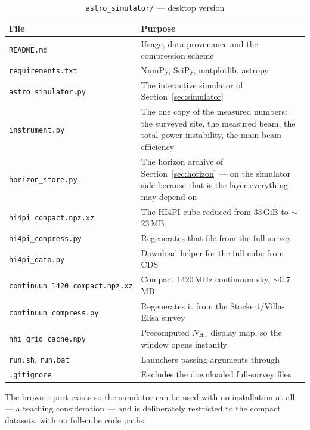\documentclass[11pt,a4paper]{article}
\begin{document}
\begin{table}[H]
\centering
\caption{\texttt{astro\_simulator/} --- desktop version}
\small
\begin{tabular}{lp{8.6cm}}
\toprule
\textbf{File} & \textbf{Purpose} \\
\midrule
\texttt{README.md} & Usage, data provenance and the compression scheme \\
\texttt{requirements.txt} & NumPy, SciPy, matplotlib, astropy \\
\texttt{astro\_simulator.py} & The interactive simulator of Section~\ref{sec:simulator} \\
\texttt{instrument.py} & The one copy of the measured numbers: the surveyed site, the measured beam, the total-power instability, the main-beam efficiency \\
\texttt{horizon\_store.py} & The horizon archive of Section~\ref{sec:horizon} --- on the simulator side because that is the layer everything may depend on \\
\texttt{hi4pi\_compact.npz.xz} & The HI4PI cube reduced from 33\,GiB to $\sim$23\,MB \\
\texttt{hi4pi\_compress.py} & Regenerates that file from the full survey \\
\texttt{hi4pi\_data.py} & Download helper for the full cube from CDS \\
\texttt{continuum\_1420\_compact.npz.xz} & Compact 1420\,MHz continuum sky, $\sim$0.7\,MB \\
\texttt{continuum\_compress.py} & Regenerates it from the Stockert/Villa-Elisa survey \\
\texttt{nhi\_grid\_cache.npy} & Precomputed $N_{\text{H\,\textsc{i}}}$ display map, so the window opens instantly \\
\texttt{run.sh}, \texttt{run.bat} & Launchers passing arguments through \\
\texttt{.gitignore} & Excludes the downloaded full-survey files \\
\bottomrule
\end{tabular}
\end{table}

The browser port exists so the simulator can be used with no installation at all --- a teaching consideration --- and is deliberately restricted to the compact datasets, with no full-cube code paths.
\end{document}
